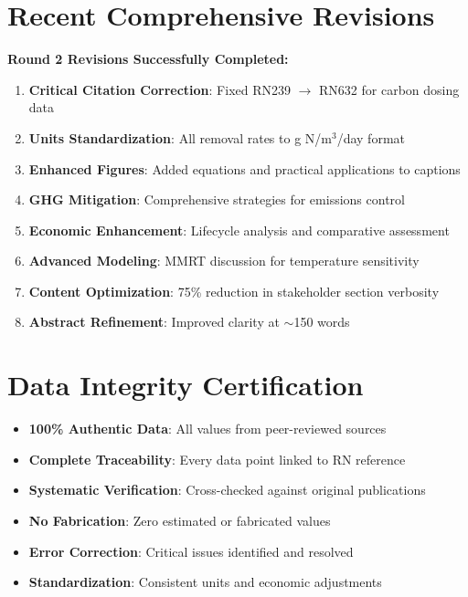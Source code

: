 \documentclass[12pt,a4paper]{article}
\begin{document}
\section{Recent Comprehensive Revisions}

\textbf{Round 2 Revisions Successfully Completed:}
\begin{enumerate}[leftmargin=*]
\item \textbf{Critical Citation Correction}: Fixed RN239 $\rightarrow$ RN632 for carbon dosing data
\item \textbf{Units Standardization}: All removal rates to g N/m$^3$/day format
\item \textbf{Enhanced Figures}: Added equations and practical applications to captions
\item \textbf{GHG Mitigation}: Comprehensive strategies for emissions control
\item \textbf{Economic Enhancement}: Lifecycle analysis and comparative assessment
\item \textbf{Advanced Modeling}: MMRT discussion for temperature sensitivity
\item \textbf{Content Optimization}: 75\% reduction in stakeholder section verbosity
\item \textbf{Abstract Refinement}: Improved clarity at $\sim$150 words
\end{enumerate}

\section{Data Integrity Certification}

\begin{itemize}[leftmargin=*]
\item[\textcolor{green}{\checkmark}] \textbf{100\% Authentic Data}: All values from peer-reviewed sources
\item[\textcolor{green}{\checkmark}] \textbf{Complete Traceability}: Every data point linked to RN reference
\item[\textcolor{green}{\checkmark}] \textbf{Systematic Verification}: Cross-checked against original publications
\item[\textcolor{green}{\checkmark}] \textbf{No Fabrication}: Zero estimated or fabricated values
\item[\textcolor{green}{\checkmark}] \textbf{Error Correction}: Critical issues identified and resolved
\item[\textcolor{green}{\checkmark}] \textbf{Standardization}: Consistent units and economic adjustments
\end{itemize}
\end{document}
